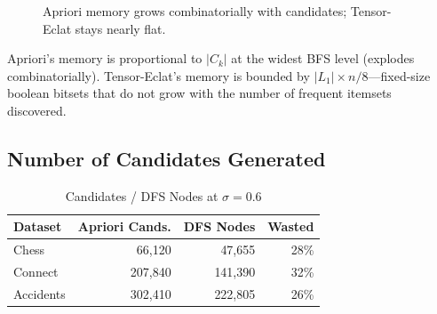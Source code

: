 \documentclass[conference]{IEEEtran}
\begin{document}
\begin{figure}[htbp]
    \centering
    \caption{Apriori memory grows combinatorially with candidates; Tensor-Eclat stays nearly flat.}
    \label{fig:memory}
\end{figure}

Apriori's memory is proportional to $|C_k|$ at the widest BFS level (explodes combinatorially). Tensor-Eclat's memory is bounded by $|L_1| \times n/8$---fixed-size boolean bitsets that do not grow with the number of frequent itemsets discovered.

\subsection{Number of Candidates Generated}

\begin{table}[htbp]
\caption{Candidates / DFS Nodes at $\sigma = 0.6$}
\centering
\begin{tabular}{@{}lrrr@{}}
\toprule
\textbf{Dataset} & \textbf{Apriori Cands.} & \textbf{DFS Nodes} & \textbf{Wasted} \\ \midrule
Chess & 66,120 & 47,655 & 28\% \\
Connect & 207,840 & 141,390 & 32\% \\
Accidents & 302,410 & 222,805 & 26\% \\ \bottomrule
\end{tabular}
\label{tab:candidates}
\end{table}
\end{document}
